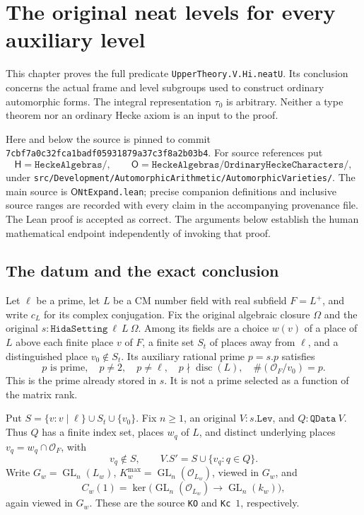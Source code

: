 \section{The original neat levels for every auxiliary level}
\label{sec:neat-levels}

This chapter proves the full predicate \texttt{UpperTheory.V.Hi.neatU}.
Its conclusion concerns the actual frame and level subgroups used to
construct ordinary automorphic forms.  The integral representation
\(\tau _0\) is arbitrary.  Neither a type theorem nor an ordinary Hecke
axiom is an input to the proof.

Here and below the source is pinned to commit
\texttt{7cbf7a0c32fca1badf05931879a37c3f8a2b03b4}.
For source references put
\[
 \mathsf H=\texttt{HeckeAlgebras/},\qquad
 \mathsf O=\texttt{HeckeAlgebras/OrdinaryHeckeCharacters/},
\]
under
\texttt{src/Development/AutomorphicArithmetic/AutomorphicVarieties/}.
The main source is \(\mathsf O\)\texttt{NtExpand.lean}; precise companion
definitions and inclusive source ranges are recorded with every claim
in the accompanying provenance file.  The Lean proof is accepted as
correct.  The arguments below establish the human mathematical endpoint
independently of invoking that proof.

\subsection{The datum and the exact conclusion}

Let \(\ell\) be a prime, let \(L\) be a CM number field with real subfield
\(F=L^+\), and write \(c_L\) for its complex conjugation.  Fix the original
algebraic closure \(\Omega\) and the original
\(s:\texttt{HidaSetting}\ \ell\ L\ \Omega\).  Among its fields are a
choice \(w(v)\) of a place of \(L\) above each finite place \(v\) of \(F\),
a finite set \(S_t\) of places away from \(\ell\), and a distinguished
place \(v_0\notin S_t\).  Its auxiliary rational prime \(p=s.p\) satisfies
\begin{equation}\label{eq:ntl-aux-data}
 p\text{ is prime},\quad p\ne2,\quad p\ne\ell,\quad
 p\nmid\operatorname{disc}(L),\quad
 \#(\mathcal O_F/v_0)=p.
\end{equation}
This is the prime already stored in \(s\).  It is not a prime selected
as a function of the matrix rank.

Put
\(S=\{v:v\mid\ell\}\cup S_t\cup\{v_0\}\).
Fix \(n\ge1\), an original \(V:s.\texttt{Lev}\), and
\(Q:\texttt{QData}\ V\).  Thus \(Q\) has a finite index set, places
\(w_q\) of \(L\), and distinct underlying places
\(v_q=w_q\cap\mathcal O_F\), with
\begin{equation}\label{eq:ntl-Q}
 v_q\notin S,\qquad V.S'=S\cup\{v_q:q\in Q\}.
\end{equation}
Write \(G_w=\operatorname{GL}_n(L_w)\),
\(K_w^{\max}=\operatorname{GL}_n(\mathcal O_{L_w})\), viewed in \(G_w\),
and
\[
 C_w(1)=\ker\bigl(\operatorname{GL}_n(\mathcal O_{L_w})
       \longrightarrow\operatorname{GL}_n(k_w)\bigr),
\]
again viewed in \(G_w\).  These are the source \texttt{KO} and
\texttt{Kc}\ \(1\), respectively.

